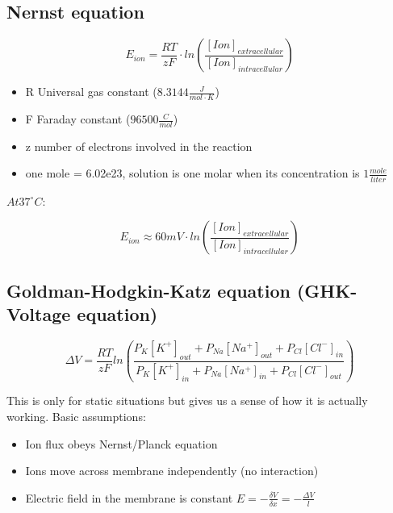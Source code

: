 \documentclass[english,11pt]{article}
\begin{document}
\subsection{Nernst equation}

\begin{equation}
E_{ion}= \frac{RT}{zF} \cdot ln (\frac{[Ion]_{extracellular}}{[Ion]_{intracellular}}) 
\end{equation}




\begin{itemize}
\item R Universal gas constant ($8.3144 \frac{J}{mol \cdot K}$)
\item F Faraday constant ($ 96500 \frac{C}{mol}$)
\item z number of electrons involved in the reaction
\item one mole = 6.02e23, solution is one molar when its concentration is $1 \frac{mole}{liter}$
\end{itemize}

$At 37^\circ C :$

\begin{equation}
E_{ion} \approx 60 mV \cdot ln ({\frac{[Ion]_{extracellular}}{[Ion]_{intracellular}}}) 
\end{equation}



\subsection{Goldman-Hodgkin-Katz equation (GHK-Voltage equation)}

\begin{equation}
\Delta V = \frac{RT}{zF} ln(\frac{P_K[K^+]_{out} + P_{Na}[Na^+]_{out} + P_{Cl}[Cl^{-}]_{in}}{P_K[K^+]_{in} + P_{Na}[Na^+]_{in} + P_{Cl}[Cl^{-}]_{out}})
\end{equation}

This is only for static situations but gives us a sense of how it is actually working.
Basic assumptions:
\begin{itemize}
\item Ion flux obeys Nernst/Planck equation
\item Ions move across membrane independently (no interaction)
\item Electric field in the membrane is constant $E = -\frac{\delta V}{\delta x} = - \frac{\Delta V}{l}$
\end{itemize}
\end{document}
